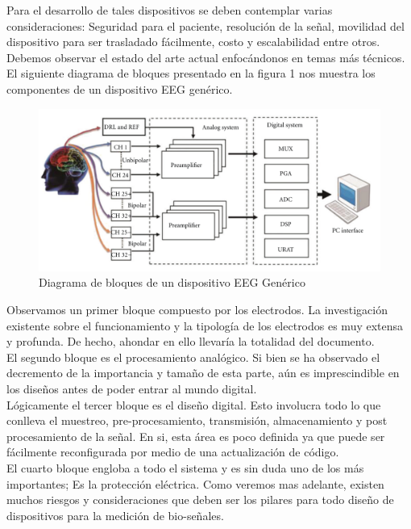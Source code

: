 Para el desarrollo de tales dispositivos se deben contemplar varias consideraciones: Seguridad para el paciente, resolución de la señal, movilidad del dispositivo para ser trasladado fácilmente, costo y escalabilidad entre otros. Debemos observar el estado del arte actual enfocándonos en temas más técnicos. El siguiente diagrama de bloques presentado en la figura 1 nos muestra los componentes de un dispositivo EEG genérico.\\

\begin{figure}[htbp]
\centering
\includegraphics[width=.9\linewidth]{Kap2/bloques_EEG.png}
\caption{\label{fig:bloques_eeg}Diagrama de bloques de un dispositivo EEG Genérico}
\end{figure}

Observamos un primer bloque compuesto por los electrodos. La investigación existente sobre el funcionamiento y la tipología de los electrodos es muy extensa y profunda. De hecho, ahondar en ello llevaría la totalidad del documento.\\

El segundo bloque es el procesamiento analógico. Si bien se ha observado el decremento de la importancia y tamaño de esta parte, aún es imprescindible en los diseños antes de poder entrar al mundo digital.\\

Lógicamente el tercer bloque es el diseño digital. Esto involucra todo lo que conlleva el muestreo, pre-procesamiento, transmisión, almacenamiento y post procesamiento de la señal. En si, esta área es poco definida ya que puede ser fácilmente reconfigurada por medio de una actualización de código.\\

El cuarto bloque engloba a todo el sistema y es sin duda uno de los más importantes; Es la protección eléctrica. Como veremos mas adelante, existen muchos riesgos y consideraciones que deben ser los pilares para todo diseño de dispositivos para la medición de bio-señales.\\

